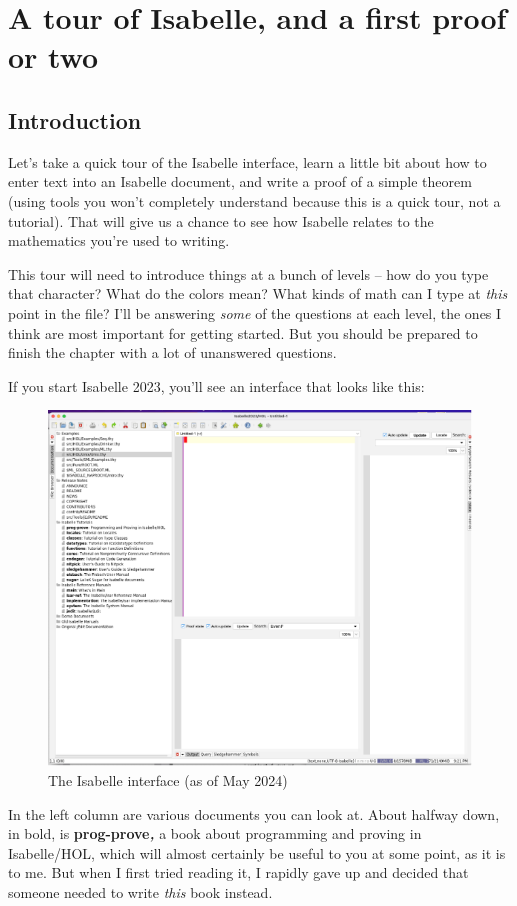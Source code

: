\chapter{A tour of Isabelle, and a first proof or two}
\section{Introduction}
Let's take a quick tour of the Isabelle interface, learn a little bit about how to enter text into an Isabelle document, and write a proof of a simple theorem (using tools you won't completely understand because this is a quick tour, not a tutorial). That will give us a chance to see how Isabelle relates to the mathematics you're used to writing. 

This tour will need to introduce things at a bunch of levels -- how do you type that character? What do the colors mean? What kinds of math can I type at \textit{this} point in the file? I'll be answering \textit{some} of the questions at each level, the ones I think are most important for getting started. But you should be prepared to finish the chapter with a lot of unanswered questions.

If you start Isabelle 2023, you'll see an interface that looks like this:
\begin{figure}[h]
    \centering
    \includegraphics[width=0.7\linewidth]{TEXT//C01//Images/interface.png}
    \caption{The Isabelle interface (as of May 2024)}
    \label{fig:C1-interface}
\end{figure}
In the left column are various documents you can look at. About halfway down, in bold, is \textbf{prog-prove}\textit{\textbf{,}} a book about programming and proving in Isabelle/HOL, which will almost certainly be useful to you at some point, as it is to me. But when I first tried reading it, I rapidly gave up and decided that someone needed to write \textit{this} book instead. 

